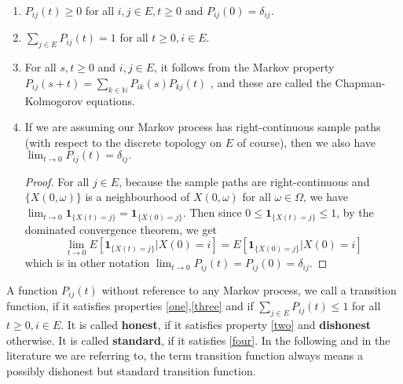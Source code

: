 \documentclass[12pt,a4paper]{scrartcl}
\numberwithin{equation}{section}
\newcommand{\N}{\mathbb{N}} %
\begin{document}
\begin{enumerate}[(1)]
\item \label{one} $ P_{ij}\left(t\right) \geq 0 $ for all $i,j \in E , t \geq 0 $ and $ P_{ij}\left(0\right) = \delta_{ij}. $ \label{one}

\item \label{two} $ \sum_{j \in E} P_{ij}\left(t\right) = 1 $ for all  $ t \geq 0, i \in E $. \label{two}
\item \label{three} For all $s,t \geq 0 $ and $ i,j \in E $, it follows from the Markov property $ P_{ij}\left(s+t\right) = \sum_{k \in \N} P_{ik}\left(s\right) P_{kj}\left(t\right) $ , and these are called the Chapman-Kolmogorov equations. \label{three}

\item \label{four} If we are assuming our Markov process has right-continuous sample paths (with respect to the discrete topology on $E$ of course), then we also have  $ \lim_{t \to 0} P_{ij}\left(t\right) = \delta_{ij}. $ \label{four}
\begin{proof}
For all $ j \in E $, because the sample paths are right-continuous and $ \lbrace X\left(0, \omega\right) \rbrace $ is a neighbourhood of $X\left(0, \omega\right)$ for all $ \omega \in \Omega $, we have $ \lim_{t \to 0} \textbf{1}_{\lbrace X\left(t\right)=j\rbrace } = \textbf{1}_{\lbrace X\left(0\right)=j\rbrace } $. Then since $ 0 \leq \textbf{1}_{\lbrace X\left(t\right)=j\rbrace } \leq 1 $, by the dominated convergence theorem, we get 
$$ \lim_{t \to 0} E\left[\textbf{1}_{\lbrace X\left(t\right)=j\rbrace } | X\left(0\right) = i \right] = E\left[\textbf{1}_{\lbrace X\left(0\right)=j\rbrace } | X\left(0\right) = i\right] $$ which is in other notation $ \lim_{t \to 0} P_{ij}\left(t\right) = P_{ij}\left(0\right) = \delta_{ij}. $
\end{proof}

\end{enumerate}

A function $ P_{ij}\left(t\right) $ without reference to any Markov process, we call a transition function, if it satisfies properties \eqref{one},\eqref{three} and if $ \sum_{j \in E} P_{ij}\left(t\right) \leq 1 $ for all  $ t \geq 0, i \in E. $ It is called \textbf{honest}, if it satisfies property \eqref{two} and \textbf{dishonest} otherwise. It is called \textbf{standard}, if it satisfies \eqref{four}. In the following and in the literature we are referring to, the term transition function always means a possibly dishonest but standard transition function. \\[2ex]
\end{document}

